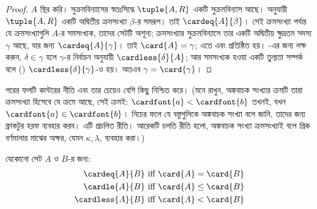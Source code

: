 \documentclass[../../../include/open-logic-section]{subfiles}
\begin{document}
\begin{proof}
$A$ স্থির করি। সুক্রমবিন্যাসের স্বতঃসিদ্ধে $\tuple{A,R}$
একটি সুক্রমবিন্যাস আছে। 
অনুযায়ী $\tuple{A,R}$ একটি অদ্বিতীয় ক্রমসংখ্যা $\beta$-র
সমরূপ। তাই $\cardeq{A}{\beta}$। সেই ক্রমসংখ্যা পর্যন্ত
যে ক্রমসংখ্যাগুলি $A$-র সমসংখ্যক, তাদের সেটটি অশূন্য;
ক্রমসংখ্যার সুক্রমবিন্যাসে তার একটি অদ্বিতীয় ক্ষুদ্রতম
সদস্য $\gamma$ আছে, যার জন্য $\cardeq{A}{\gamma}$।
তাই $\card{A}=\gamma$; এতে
 এবং  প্রতিষ্ঠিত হয়।
-এর জন্য লক্ষ করুন, $\delta\in\gamma$ হলে
$\gamma$-র নির্বাচন অনুযায়ী $\cardless{\delta}{A}$;
আর সমসংখ্যক হওয়া একটি তুল্যতা সম্পর্ক বলে
()
$\cardless{\delta}{\gamma}$-ও হয়। অতএব
$\gamma=\card{\gamma}$।
\end{proof}

পরের ফলটি কান্টরের নীতি এবং তার চেয়েও বেশি কিছু নিশ্চিত করে।
(মনে রাখুন, অঙ্কবাচক সংখ্যার ক্রমটি তারা ক্রমসংখ্যা হিসেবে
যে ক্রমে আছে, সেই ক্রমই: $\cardfont{a}<\cardfont{b}$
তখনই, যখন $\cardfont{a}\in\cardfont{b}$। নিচের ফলে
যে বস্তুগুলিকে অঙ্কবাচক সংখ্যা বলে জানি, তাদের জন্য
ফ্রাকটুর হরফ ব্যবহার করব। এটি প্রচলিত রীতি। আরেকটি
চলতি রীতি হলো, অঙ্কবাচক সংখ্যা ক্রমসংখ্যাই বলে গ্রিক
বর্ণমালার মাঝের অক্ষর, যেমন $\kappa,\lambda$, ব্যবহার করা।)
\begin{lem}
যেকোনো সেট $A$ ও $B$-র জন্য:
\begin{align*}
	\cardeq{A}{B} &\text{ iff } \card{A} = \card{B}\\
	\cardle{A}{B} &\text{ iff } \card{A} \leq \card{B}\\
	\cardless{A}{B}&\text{ iff } \card{A} < \card{B}
\end{align*}
\end{lem}
\end{document}
